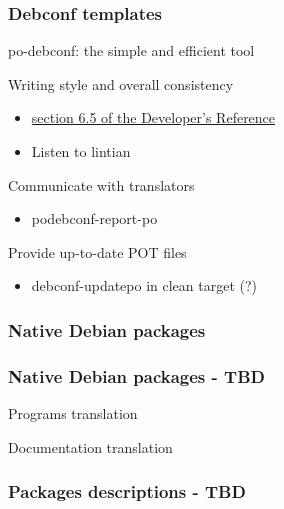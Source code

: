 \documentclass{beamer}
\begin{document}
\begin{frame}
  \frametitle{Debconf templates}
	\begin{block}
		{po-debconf: the simple and efficient tool}
	\end{block}
	\begin{block}
		{Writing style and overall consistency}
		\begin{itemize}
		\item
			\href{http://www.debian.org/doc/developers-reference/ch-best-pkging-practices.html\#s-bpp-config-mgmt}{section 6.5 of the Developer's Reference}
		\item
			Listen to lintian
		\end{itemize}
	\end{block}
	\begin{block}
		{Communicate with translators}
		\begin{itemize}
		\item
			podebconf-report-po
		\end{itemize}
	\end{block}
	\begin{block}
		{Provide up-to-date POT files}
		\begin{itemize}
		\item
			debconf-updatepo in clean target (?)
		\end{itemize}
	\end{block}
\end{frame}

\subsubsection{Native Debian packages}

\begin{frame}
  \frametitle{Native Debian packages - TBD}
	\begin{block}
		{Programs translation}
	\end{block}
	\begin{block}
		{Documentation translation}
	\end{block}
\end{frame}

\subsubsection{Packages descriptions - TBD}
\end{document}
